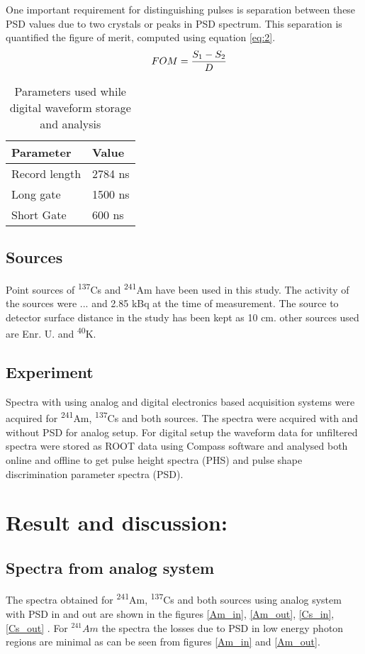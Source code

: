 \documentclass[10pt]{article}
\begin{document}
One important requirement for distinguishing pulses is separation between these PSD values due to two crystals or peaks in PSD spectrum. This separation is quantified the figure of merit, computed using equation \ref{eq:2}. 
\begin{equation}\label{eq:2}
    \centering \quad FOM =  \dfrac{S_1-S_2}{D}
\end{equation}


\begin{table}\label{tab:1}
\caption{Parameters used while digital waveform storage and analysis}
\centering

\begin{tabular}{| l | l |}  
\hline
Parameter & Value \\
\hline
Record length & 2784 ns \\
\hline
Long gate & 1500 ns \\
\hline
Short Gate & 600 ns \\
\hline

\end{tabular}

\end{table}
\subsection*{Sources} Point sources of \textsuperscript{137}Cs and \textsuperscript{241}Am have been used in this study. The activity of the sources were ... and 2.85 kBq at the time of measurement. The source to detector surface distance in the study has been kept as 10 cm. other sources used are Enr. U. and \textsuperscript{40}K.   
\subsection*{Experiment}{Spectra with using analog and digital electronics based acquisition systems were acquired for \textsuperscript{241}Am, \textsuperscript{137}Cs and both sources. The spectra were acquired with and without PSD for analog setup. For digital setup the waveform data for unfiltered spectra were stored as ROOT data using Compass software and analysed both online and offline to get pulse height spectra (PHS) and pulse shape discrimination parameter spectra (PSD).}

\section*{Result and discussion: }
\subsection*{Spectra from analog system }{The spectra obtained for \textsuperscript{241}Am, \textsuperscript{137}Cs and both sources using analog system with PSD in and out are shown in the figures \ref{Am_in}, \ref{Am_out}, \ref{Cs_in}, \ref{Cs_out} .}
{For $^{241}Am$ the spectra the losses due to PSD in low energy photon regions are minimal as can be seen from figures \ref{Am_in} and \ref{Am_out}}.  
\end{document}
